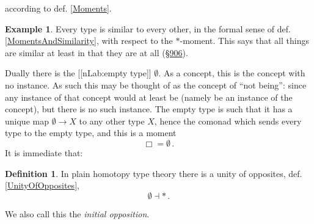 \documentclass[12pt,titlepage]{article}
\theoremstyle{plain}
\theoremstyle{definition}
\newtheorem{defn}{Definition}
\newtheorem{example}{Example}
\theoremstyle{remark}
\begin{document}
according to def. \ref{Moments}.
\begin{example}
\label{SimilarityWithRespectToPureBeing}\hypertarget{SimilarityWithRespectToPureBeing}{}
Every type is similar to every other, in the formal sense of def. \ref{MomentsAndSimilarity}, with respect to the $\ast$-moment. This says that all things are similar at least in that they are at all (\hyperlink{906}{§906}).
\end{example}
Dually there is the [[nLab:empty type]] $\emptyset$. As a concept, this is the concept with no instance. As such this may be thought of as the concept of ``not being'': since any instance of that concept would at least be (namely be an instance of the concept), but there is no such instance.
The empty type is such that it has a unique map $\emptyset \to X$ to any other type $X$, hence the comonad which sends every type to the empty type, and this is a moment
\begin{displaymath}
\Box = \emptyset
  \,.
\end{displaymath}
It is immediate that:
\begin{defn}
\label{InitialOpposition}\hypertarget{InitialOpposition}{}
In plain homotopy type theory there is a unity of opposites, def. \ref{UnityOfOpposites},
\begin{displaymath}
\emptyset \dashv \ast
  \,.
\end{displaymath}
\end{defn}
We also call this the \emph{initial opposition}.
\end{document}
